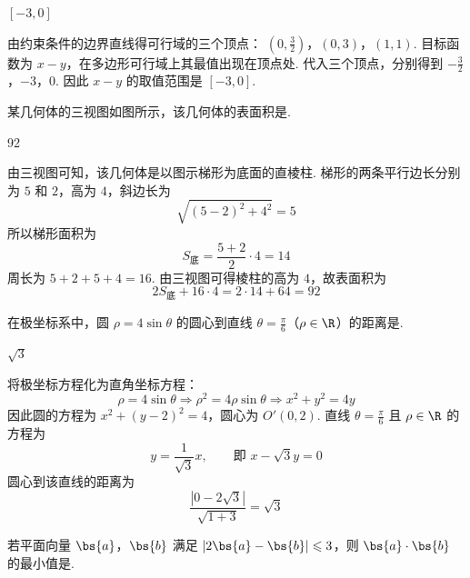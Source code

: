 \begin{answer}
\([-3,0]\)
\end{answer}

\begin{solution}
由约束条件的边界直线得可行域的三个顶点：
\((0,\tfrac32)\)，\((0,3)\)，\((1,1)\).
目标函数为 \(x-y\)，在多边形可行域上其最值出现在顶点处. 代入三个顶点，分别得到
\(-\tfrac32\)，\(-3\)，\(0\).
因此 \(x-y\) 的取值范围是 \([-3,0]\).
\end{solution}

\begin{problem}
某几何体的三视图如图所示，该几何体的表面积是\fillinblank{}.

\end{problem}

\begin{answer}
92
\end{answer}

\begin{solution}
由三视图可知，该几何体是以图示梯形为底面的直棱柱. 梯形的两条平行边长分别为 \(5\) 和 \(2\)，高为 \(4\)，斜边长为
\[
\sqrt{(5-2)^2+4^2}=5
\]
所以梯形面积为
\[
S_{\text{底}}=\frac{5+2}{2}\cdot4=14
\]
周长为 \(5+2+5+4=16\). 由三视图可得棱柱的高为 \(4\)，故表面积为
\[
2S_{\text{底}}+16\cdot4=2\cdot14+64=92
\]
\end{solution}

\begin{problem}
在极坐标系中，圆 \(\rho = 4\sin \theta\) 的圆心到直线 \(\theta = \frac{\pi}{6}\)（\(\rho \in \R\)）的距离是\fillinblank{}.
\end{problem}

\begin{answer}
\(\sqrt{3}\)
\end{answer}

\begin{solution}
将极坐标方程化为直角坐标方程：
\[
\rho=4\sin\theta
\Longrightarrow \rho^2=4\rho\sin\theta
\Longrightarrow x^2+y^2=4y
\]
因此圆的方程为 \(x^2+(y-2)^2=4\)，圆心为 \(O'(0,2)\). 直线 \(\theta=\frac{\pi}{6}\) 且 \(\rho\in\R\) 的方程为
\[
y=\frac{1}{\sqrt3}x,\qquad\text{即 }x-\sqrt3y=0
\]
圆心到该直线的距离为
\[
\frac{|0-2\sqrt3|}{\sqrt{1+3}}=\sqrt3
\]
\end{solution}

\begin{problem}
若平面向量 \(\bs{a}\)，\(\bs{b}\) 满足 \(|2\bs{a} - \bs{b}| \leqslant 3\)，则 \(\bs{a} \cdot \bs{b}\) 的最小值是\fillinblank{}.
\end{problem}


